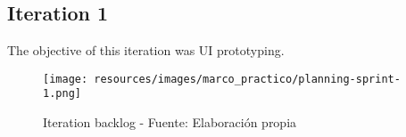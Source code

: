 \subsection{Iteration 1}
The objective of this iteration was UI prototyping.

\begin{figure}[H]
    \centering
    \texttt{[image: resources/images/marco\_practico/planning-sprint-1.png]}
    \caption{Iteration backlog - Fuente: Elaboración propia}
    \label{fig:sprint2-backlog}
\end{figure}
